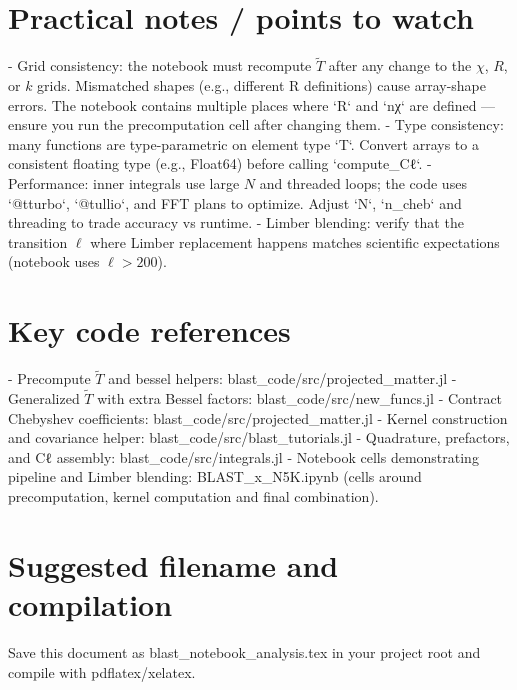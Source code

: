 \documentclass{article}
\begin{document}
\section*{Practical notes / points to watch}
- Grid consistency: the notebook must recompute $\tilde T$ after any change to the $\chi$, $R$, or $k$ grids. Mismatched shapes (e.g., different R definitions) cause array-shape errors. The notebook contains multiple places where `R` and `nχ` are defined — ensure you run the precomputation cell after changing them.
- Type consistency: many functions are type-parametric on element type `T`. Convert arrays to a consistent floating type (e.g., Float64) before calling `compute_Cℓ`.
- Performance: inner integrals use large $N$ and threaded loops; the code uses `@tturbo`, `@tullio`, and FFT plans to optimize. Adjust `N`, `n_cheb` and threading to trade accuracy vs runtime.
- Limber blending: verify that the transition $\ell$ where Limber replacement happens matches scientific expectations (notebook uses $\ell>200$).

\section*{Key code references}
- Precompute $\tilde T$ and bessel helpers: blast_code/src/projected_matter.jl
- Generalized $\tilde T$ with extra Bessel factors: blast_code/src/new_funcs.jl
- Contract Chebyshev coefficients: blast_code/src/projected_matter.jl
- Kernel construction and covariance helper: blast_code/src/blast_tutorials.jl
- Quadrature, prefactors, and Cℓ assembly: blast_code/src/integrals.jl
- Notebook cells demonstrating pipeline and Limber blending: BLAST_x_N5K.ipynb (cells around precomputation, kernel computation and final combination).

\section*{Suggested filename and compilation}
Save this document as blast_notebook_analysis.tex in your project root and compile with pdflatex/xelatex.
\end{document}
